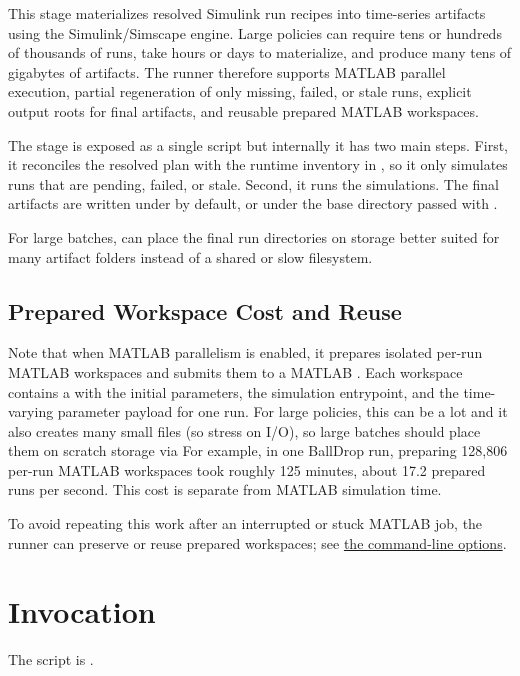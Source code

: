 \documentclass[11pt]{article}
\begin{document}
\label{docstart:simulation_stage}
This stage materializes resolved Simulink run recipes into time-series artifacts using the Simulink/Simscape engine.
Large policies can require tens or hundreds of thousands of runs, take hours or days to materialize, and produce many tens of gigabytes of artifacts.
The runner therefore supports MATLAB parallel execution, partial regeneration of only missing, failed, or stale runs, explicit output roots for final artifacts, and reusable prepared MATLAB workspaces.

The stage is exposed as a single script but internally it has two main steps.
First, it reconciles the resolved plan with the runtime inventory in , so it only simulates runs that are pending, failed, or stale.
Second, it runs the simulations. 
The final artifacts are written under  by default, or under the base directory passed with .

For large batches,  can place the final run directories on storage better suited for many artifact folders instead of a shared or slow filesystem.

\subsection*{Prepared Workspace Cost and Reuse}
Note that when MATLAB parallelism is enabled, it prepares isolated per-run MATLAB workspaces and submits them to a MATLAB .
Each workspace contains a  with the initial parameters, the simulation entrypoint, and the time-varying parameter payload for one run.
For large policies, this can be a lot and it also creates many small files (so stress on I/O), so large batches should place them on scratch storage via 
For example, in one BallDrop run, preparing 128,806 per-run MATLAB workspaces took roughly 125 minutes, about 17.2 prepared runs per second.
This cost is separate from MATLAB simulation time.

To avoid repeating this work after an interrupted or stuck MATLAB job, the runner can preserve or reuse prepared workspaces; see \hyperref[sec:simulate-cli-options]{the command-line options}.


\section*{Invocation}
The script is .
\end{document}
